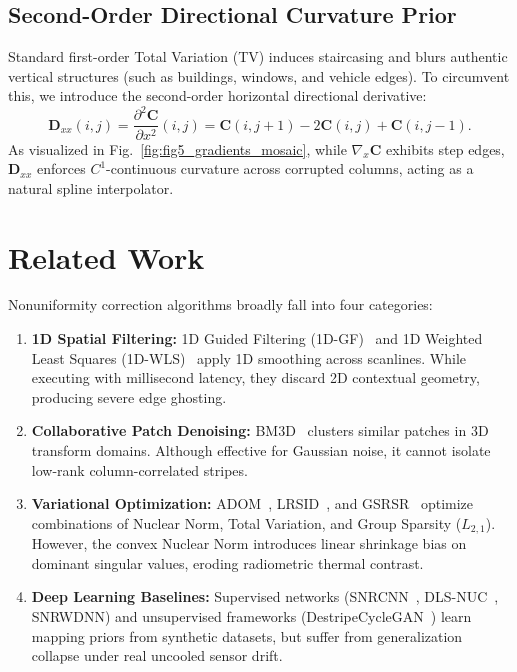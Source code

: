 \documentclass[journal]{IEEEtran}
\begin{document}
\subsection{Second-Order Directional Curvature Prior}
Standard first-order Total Variation (TV) induces staircasing and blurs authentic vertical structures (such as buildings, windows, and vehicle edges). To circumvent this, we introduce the second-order horizontal directional derivative:
\begin{equation}
    \mathbf{D}_{xx}(i, j) = \frac{\partial^2 \mathbf{C}}{\partial x^2}(i, j) = \mathbf{C}(i, j+1) - 2\mathbf{C}(i, j) + \mathbf{C}(i, j-1).
\end{equation}
As visualized in Fig.~\ref{fig:fig5_gradients_mosaic}, while $\nabla_x \mathbf{C}$ exhibits step edges, $\mathbf{D}_{xx}$ enforces $C^1$-continuous curvature across corrupted columns, acting as a natural spline interpolator.

\section{Related Work}
\label{sec:related_work}

Nonuniformity correction algorithms broadly fall into four categories:
\begin{enumerate}
    \item \textbf{1D Spatial Filtering:} 1D Guided Filtering (1D-GF)~\cite{cao20161dgf} and 1D Weighted Least Squares (1D-WLS)~\cite{dong20181dwls} apply 1D smoothing across scanlines. While executing with millisecond latency, they discard 2D contextual geometry, producing severe edge ghosting.
    \item \textbf{Collaborative Patch Denoising:} BM3D~\cite{dabov2007bm3d} clusters similar patches in 3D transform domains. Although effective for Gaussian noise, it cannot isolate low-rank column-correlated stripes.
    \item \textbf{Variational Optimization:} ADOM~\cite{kim2023adom}, LRSID~\cite{chang2016lrsid}, and GSRSR~\cite{chen2017gsrsr} optimize combinations of Nuclear Norm, Total Variation, and Group Sparsity ($L_{2,1}$). However, the convex Nuclear Norm introduces linear shrinkage bias on dominant singular values, eroding radiometric thermal contrast.
    \item \textbf{Deep Learning Baselines:} Supervised networks (SNRCNN~\cite{kuang2018snrcnn}, DLS-NUC~\cite{he2018dlsnuc}, SNRWDNN) and unsupervised frameworks (DestripeCycleGAN~\cite{yang2024destripecyclegan}) learn mapping priors from synthetic datasets, but suffer from generalization collapse under real uncooled sensor drift.
\end{enumerate}
\end{document}
